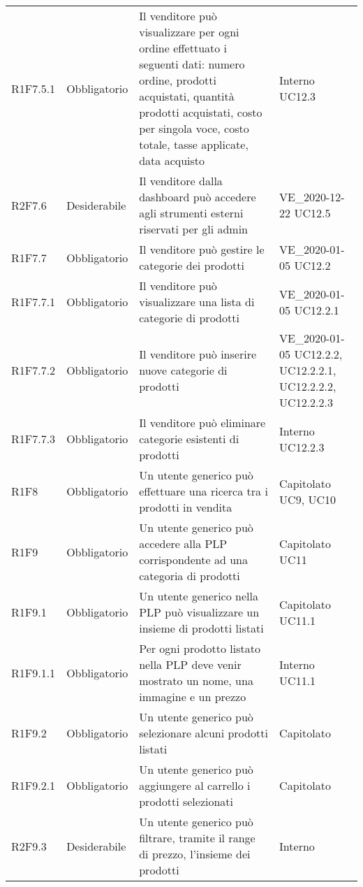 {\begin{longtable}{C{2.5cm} C{2.8cm} C{6.7cm} C{2.5cm}}
R1F7.5.1 & Obbligatorio & Il venditore può visualizzare per ogni ordine effettuato i seguenti dati: numero ordine, prodotti acquistati, quantità prodotti acquistati, costo per singola voce, costo totale, tasse applicate, data acquisto & Interno \newline UC12.3\\
R2F7.6 & Desiderabile & Il venditore dalla dashboard può accedere agli strumenti esterni riservati per gli admin & VE\_2020-12-22 \newline UC12.5\\
R1F7.7 & Obbligatorio & Il venditore può gestire le categorie dei prodotti & VE\_2020-01-05 \newline UC12.2\\
R1F7.7.1 & Obbligatorio & Il venditore può visualizzare una lista di categorie di prodotti & VE\_2020-01-05 \newline UC12.2.1\\
R1F7.7.2 & Obbligatorio & Il venditore può inserire nuove categorie di prodotti & VE\_2020-01-05 \newline UC12.2.2, UC12.2.2.1, UC12.2.2.2, UC12.2.2.3\\
R1F7.7.3 & Obbligatorio & Il venditore può eliminare categorie esistenti di prodotti & Interno \newline UC12.2.3\\


R1F8 & Obbligatorio & Un utente generico può effettuare una ricerca tra i prodotti in vendita & Capitolato \newline UC9, UC10\\


R1F9 & Obbligatorio & Un utente generico può accedere alla PLP corrispondente ad una categoria di prodotti & Capitolato \newline UC11 \\
R1F9.1 & Obbligatorio & Un utente generico nella PLP può visualizzare un insieme di prodotti listati & Capitolato \newline UC11.1\\
R1F9.1.1 & Obbligatorio & Per ogni prodotto listato nella PLP deve venir mostrato un nome, una immagine e un prezzo & Interno \newline UC11.1\\
R1F9.2 & Obbligatorio & Un utente generico può selezionare alcuni prodotti listati & Capitolato \\
R1F9.2.1 & Obbligatorio & Un utente generico può aggiungere al carrello i prodotti selezionati & Capitolato \\
R2F9.3 & Desiderabile & Un utente generico può filtrare, tramite il range di prezzo, l'insieme dei prodotti & Interno\\


\end{longtable}}
